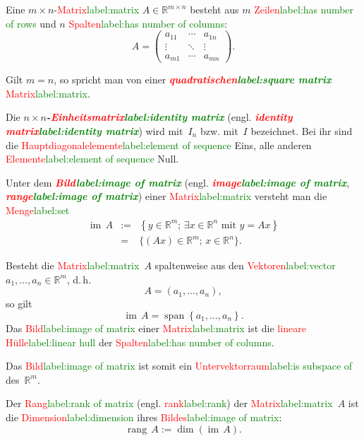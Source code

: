 \documentclass[a4paper,twoside,english,ngerman,deutsch,german,sectrefs,envcountsame,envcountchap]{svmono}
\newcommand{\setref}[2]{\textcolor{red}{#1}\textcolor{green}{#2}}
\begin{document}
Eine $m\times n$-\setref{Matrix}{label:matrix} $A\in{\mathbb{R}}^{m\times n}$ besteht aus $m$ \setref{Zeilen}{label:has number of rows} und $n$ \setref{Spalten}{label:has number of columns}:
\[
A=\left(\begin{array}{ccc} a_{11} & \cdots & a_{1n}\\
\vdots & \ddots & \vdots\\
a_{m1} & \cdots & a_{mn}
\end{array}\right).
\]

Gilt $m=n$, so spricht man von einer \textbf{\em \setref{quadratischen}{label:square matrix}} \setref{Matrix}{label:matrix}.

Die $n\times n$\textbf{\em -\setref{Einheitsmatrix}{label:identity matrix}} (engl. \textbf{\em \setref{identity matrix}{label:identity matrix}}) wird mit~$I_{n}$ bzw. mit~$I$ bezeichnet. Bei ihr sind die \setref{Hauptdiagonalelemente}{label:element of sequence} Eins, alle anderen \setref{Elemente}{label:element of sequence} Null.

Unter dem \textbf{\em \setref{Bild}{label:image of matrix}} (engl. \textbf{\em \setref{image}{label:image of matrix}}, \textbf{\em \setref{range}{label:image of matrix}}) einer \setref{Matrix}{label:matrix} versteht man die \setref{Menge}{label:set}
\[
\begin{array}{lrl}
{\operatorname{im}}\,A & := & \left\{ y\in{\mathbb{R}}^{m};\,\exists x\in{\mathbb{R}}^{n}\textrm{ mit }y=Ax\right\} \\
 & = & \{(Ax)\in{\mathbb{R}}^{m};\,x\in{\mathbb{R}}^{n}\}.
\end{array}
\]

Besteht die \setref{Matrix}{label:matrix}~$A$ spaltenweise aus den \setref{Vektoren}{label:vector} $a_{1},\ldots,a_{n}\in{\mathbb{R}}^{m}$, d.\,h.
\[
A=\left(a_{1},\ldots,a_{n}\right),
\]
so gilt
\[
{\operatorname{im}}\,A={\operatorname{span}}\left\{ a_{1},\ldots,a_{n}\right\} .
\]
Das \setref{Bild}{label:image of matrix} einer \setref{Matrix}{label:matrix} ist die \setref{lineare Hülle}{label:linear hull} der \setref{Spalten}{label:has number of columns}.

Das \setref{Bild}{label:image of matrix} ist somit ein \setref{Untervektorraum}{label:is subspace of} des~$\mathbb{R}^{m}$.

Der \setref{Rang}{label:rank of matrix} (engl. \setref{rank}{label:rank}) der \setref{Matrix}{label:matrix}~$A$ ist die \setref{Dimension}{label:dimension} ihres \setref{Bildes}{label:image of matrix}:
\begin{equation}
{\operatorname{rang}}\,A:=\dim({\operatorname{im}}\,A).\label{eq:rank}
\end{equation}
\end{document}
